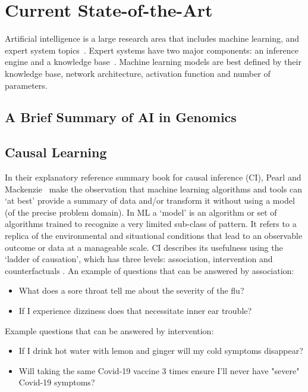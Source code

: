 \section{Current State-of-the-Art}

Artificial intelligence is a large research area that includes machine learning, and expert system topics~\cite{RussellNorvig:2016}.
Expert systems have two major components: an inference engine and a knowledge base~\cite{Liao:2005,Tan:2017}.
Machine learning models are best defined by their knowledge base, network architecture, activation function and number of parameters.

\subsection{A Brief Summary of AI in Genomics}

\subsection{Causal Learning}
In their explanatory reference summary book for causal inference (CI), Pearl and Mackenzie~\cite{Pearl:2018} make the observation that machine learning algorithms and tools can `at best' provide a summary of data and/or transform it without using a model (of the precise problem domain).
In ML a `model' is an algorithm or set of algorithms trained to recognize a very limited sub-class of pattern.
It refers to a replica of the environmental and situational conditions that lead to an observable outcome or data at a manageable scale.
CI describes its usefulness using the `ladder of causation', which has three levels: association, intervention and counterfactuals \cite{Pearl:2018}.
An example of questions that can be answered by association:
\begin{itemize}
    \item What does a sore throat tell me about the severity of the flu?
    \item If I experience dizziness does that necessitate inner ear trouble?
\end{itemize}

Example questions that can be answered by intervention:
\begin{itemize}
    \item If I drink hot water with lemon and ginger will my cold symptoms disappear?
    \item Will taking the same Covid-19 vaccine 3 times ensure I'll never have "severe" Covid-19 symptoms?
\end{itemize}

